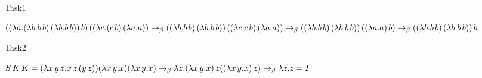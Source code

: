 \documentclass[12pt]{article}
\begin{document}
\Huge
\begin{center}
    Task1
\end{center}

$\\*((\lambda a.(\lambda b.b\,b)\,(\lambda b.b\,b))\,b)\,((\lambda c.(c\,b)\,(\lambda a.a)) \to_\beta
	\\*((\lambda b.b\,b)\,(\lambda b.b\,b))\,((\lambda c.c\,b)\,(\lambda a.a)) \to_\beta
	\\*((\lambda b.b\,b)\,(\lambda b.b\,b))\,((\lambda a.a)\,b) \to_\beta 
	\\*((\lambda b.b\,b)\,(\lambda b.b\,b))\,b$

\begin{center}
    Task2
\end{center}

$\\*S\,K\,K = 
    \\*(\lambda x\,y\,z. x \, z \, (y \, z)) (\lambda x\, y.x)(\lambda x\, y.x)\to_\beta
	\\*\lambda z.(\lambda x\,y.x)\,z((\lambda x\,y.x)\,z) \to_\beta
	\\*\lambda z.z = I$
\end{document}
